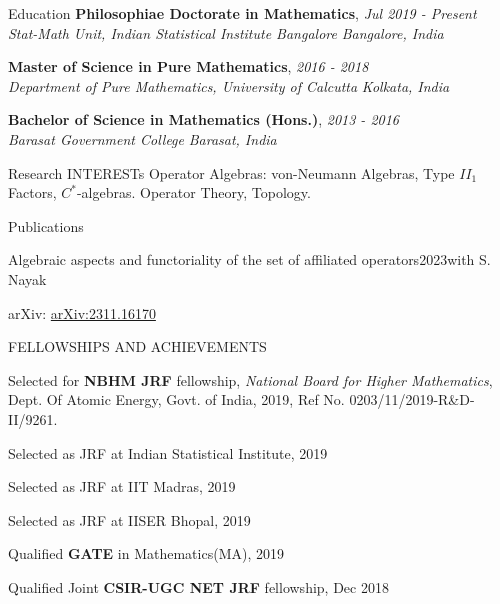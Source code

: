 \documentclass{resume} %
\begin{document}

\begin{rSection}{Education}
{\bf Philosophiae Doctorate in Mathematics},  \hfill {\em Jul 2019 - Present}\\ {\it Stat-Math Unit, Indian Statistical Institute Bangalore} \hfill {\em Bangalore, India}

{\bf Master of Science in Pure Mathematics},  \hfill {\em 2016 - 2018}\\ {\it Department of Pure Mathematics, University of Calcutta} \hfill {\em Kolkata, India}

{\bf Bachelor of Science in Mathematics (Hons.)},  \hfill {\em 2013 - 2016}\\ {\it Barasat Government College} \hfill {\em Barasat, India}

\end{rSection}


\begin{rSection}{Research INTERESTs}
	Operator Algebras: von-Neumann Algebras, Type $II_1$ Factors, $C^*$-algebras. Operator Theory, Topology.
	
\end{rSection}

\begin{rSection}{Publications}
	\begin{rSubsection}{Algebraic aspects and functoriality of the set of affiliated operators}{2023}{with S. Nayak}{}
		\item arXiv: \href{https://arxiv.org/abs/2311.16170}{arXiv:2311.16170}
	\end{rSubsection}
	
\end{rSection}

\begin{rSection}{FELLOWSHIPS AND ACHIEVEMENTS}
	\begin{rSubsection}{}{}{}{}
		\item Selected for \textbf{NBHM JRF} fellowship, \emph{National Board for Higher Mathematics}, Dept. Of Atomic Energy, Govt. of India, 2019, Ref No. 0203/11/2019-R\&D-II/9261.
		
		\item Selected as JRF at Indian Statistical Institute, 2019
		
		\item Selected as JRF at IIT Madras, 2019
		
		\item Selected as JRF at IISER Bhopal, 2019
		
		\item Qualified \textbf{GATE} in Mathematics(MA), 2019
		
		\item Qualified Joint \textbf{CSIR-UGC NET JRF} fellowship, Dec 2018
	\end{rSubsection}

\end{rSection}
\end{document}
